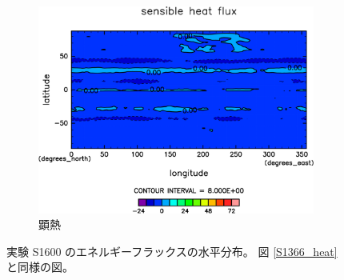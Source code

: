 \documentclass[body]{subfiles}
\begin{document}
\begin{figure}[t]
\begin{subfigure}{.4\textwidth}
		\includegraphics[width=\textwidth]{S1600/Sens,time=3650:4015-crop-rotate.pdf}
		\caption{顕熱\hmu*{[W/m^{-2}]}}\label{S1600顕熱}
	\end{subfigure}
	\caption[実験 S1600 のエネルギーフラックスの水平分布]{
		実験 S1600 のエネルギーフラックスの水平分布。
		図 \ref{S1366_heat} と同様の図。
	}\label{S1600_heat}
\end{figure}
\end{document}
